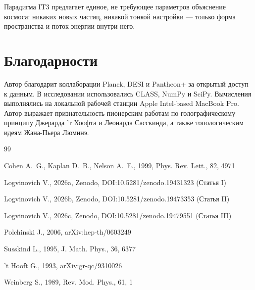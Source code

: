 \documentclass[12pt,a4paper]{article}
\begin{document}
Парадигма IT3 предлагает единое, не требующее параметров объяснение космоса: никаких новых частиц, никакой тонкой настройки — только форма пространства и поток энергии внутри него.

\section*{Благодарности}

Автор благодарит коллаборации Planck, DESI и Pantheon+ за открытый доступ к данным. В исследовании использовались CLASS, NumPy и SciPy. Вычисления выполнялись на локальной рабочей станции Apple Intel-based MacBook Pro. Автор выражает признательность пионерским работам по голографическому принципу Джерарда 'т Хоофта и Леонарда Сасскинда, а также топологическим идеям Жана-Пьера Люминэ.

\begin{thebibliography}{99}

Cohen A.~G., Kaplan D.~B., Nelson A.~E., 1999, Phys. Rev. Lett., 82, 4971

Logvinovich V., 2026a, Zenodo, DOI:10.5281/zenodo.19431323 (Статья I)

Logvinovich V., 2026b, Zenodo, DOI:10.5281/zenodo.19473353 (Статья II)

Logvinovich V., 2026c, Zenodo, DOI:10.5281/zenodo.19479551 (Статья III)

Polchinski J., 2006, arXiv:hep-th/0603249

Susskind L., 1995, J. Math. Phys., 36, 6377

't Hooft G., 1993, arXiv:gr-qc/9310026

Weinberg S., 1989, Rev. Mod. Phys., 61, 1

\end{thebibliography}
\end{document}
